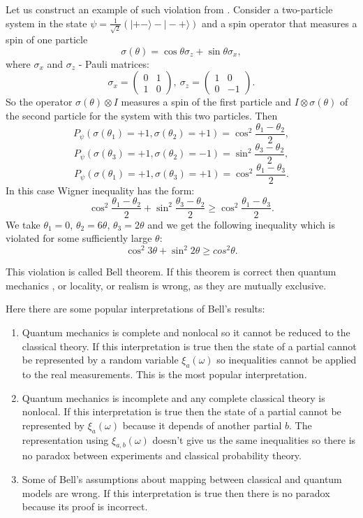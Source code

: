 \documentclass[11pt]{article}
\begin{document}
Let us construct an example of such violation from \cite{Khrennikov_information}. Consider a two-particle system in the state $\psi = \frac{1}{\sqrt{2}}(|+-\rangle - |-+\rangle)$ and a spin operator that measures a spin of one particle
\[
\sigma(\theta) = \cos\theta\sigma_z + \sin\theta\sigma_x,
\] 
where $\sigma_x$ and $\sigma_z$ - Pauli matrices:
\[
\sigma_x = 
\begin{pmatrix}
0 & 1\\
1 & 0
\end{pmatrix},\ \sigma_z = 
\begin{pmatrix}
1 & 0\\
0 & -1
\end{pmatrix}.
\]
So the operator $\sigma(\theta) \otimes I$ measures a spin of the first particle and $I \otimes \sigma(\theta)$ of the second particle for the system with this two particles.
Then
\[
P_\psi(\sigma(\theta_1) = + 1, \sigma(\theta_2) = +1) = \cos^2\frac{\theta_1 - \theta_2}{2},
\]
\[
P_\psi(\sigma(\theta_3) = + 1, \sigma(\theta_2) = -1) = \sin^2\frac{\theta_3 - \theta_2}{2},
\]
\[
P_\psi(\sigma(\theta_1) = + 1, \sigma(\theta_3) = +1) = \cos^2\frac{\theta_1 - \theta_3}{2}.
\]
In this case Wigner inequality has the form:
\[
\cos^2\frac{\theta_1 - \theta_2}{2} + \sin^2\frac{\theta_3 - \theta_2}{2} \geq  \cos^2\frac{\theta_1 - \theta_3}{2}.
\]
We take $\theta_1 = 0$, $\theta_2 = 6\theta$, $\theta_3 = 2\theta$ and we get the following inequality which is violated for some sufficiently large $\theta$:
\[
\cos^2 3\theta + \sin^2 2\theta \geq cos^2 \theta.
\]

This violation is called Bell theorem. If this theorem is correct then quantum mechanics , or locality, or realism is wrong, as they are mutually exclusive. 

Here there are some popular interpretations of Bell's results:
\begin{enumerate}
\item Quantum mechanics is complete and nonlocal so it cannot be reduced to the classical theory.
If this interpretation is true then the state of a partial cannot be represented by a random variable $\xi_a(\omega)$ so inequalities cannot be applied to the real measurements. This is the most popular interpretation.

\item Quantum mechanics is incomplete and any complete classical theory is nonlocal.
If this interpretation is true then the state of a partial cannot be represented by $\xi_a(\omega)$ because it depends of another partial $b$. The representation using $\xi_{a,b}(\omega)$ doesn't give us the same inequalities so there is no paradox between experiments and classical probability theory.

\item Some of Bell's assumptions about mapping between classical and quantum models are wrong. If this interpretation is true then there is no paradox because its proof is incorrect.
\end{enumerate}
\end{document}
